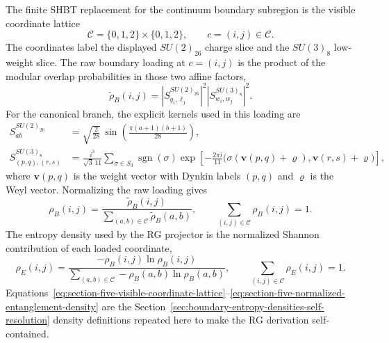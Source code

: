 \documentclass[11pt,letterpaper]{article}
\theoremstyle{plain}
\begin{document}
The finite SHBT replacement for the continuum boundary subregion is the visible
coordinate lattice
\begin{equation}
\label{eq:section-five-visible-coordinate-lattice}
 \mathcal C=\{0,1,2\}\times\{0,1,2\},
 \qquad
 c=(i,j)\in\mathcal C.
\end{equation}
The coordinates label the displayed $SU(2)_{26}$ charge slice and the
$SU(3)_8$ low-weight slice.  The raw boundary loading at $c=(i,j)$ is the
product of the modular overlap probabilities in those two affine factors,
\begin{equation}
\label{eq:section-five-raw-boundary-loading}
 \widetilde\rho_B(i,j)
 =
 \left|S^{SU(2)_{26}}_{q_i,\ell_j}\right|^2
 \left|S^{SU(3)_8}_{w_i,w_j}\right|^2.
\end{equation}
For the canonical branch, the explicit kernels used in this loading are
\begin{align}
\label{eq:section-five-explicit-visible-s-kernels}
 S_{ab}^{SU(2)_{26}}
 &=
 \sqrt{\frac{2}{28}}\,
 \sin\!\left(\frac{\pi(a+1)(b+1)}{28}\right),\nonumber\\
 S_{(p,q),(r,s)}^{SU(3)_8}
 &=
 \frac{i^3}{\sqrt{3}\,11}
 \sum_{\sigma\in S_3}
 \operatorname{sgn}(\sigma)
 \exp\!\left[
 -\frac{2\pi i}{11}
 \bigl(
 \sigma(\mathbf v(p,q)+\varrho),
 \mathbf v(r,s)+\varrho
 \bigr)
 \right],
\end{align}
where $\mathbf v(p,q)$ is the weight vector with Dynkin labels $(p,q)$ and
$\varrho$ is the Weyl vector.  Normalizing the raw loading gives
\begin{equation}
\label{eq:section-five-normalized-loading-density}
 \rho_B(i,j)
 =
 \frac{\widetilde\rho_B(i,j)}
 {\sum_{(a,b)\in\mathcal C}\widetilde\rho_B(a,b)},
 \qquad
 \sum_{(i,j)\in\mathcal C}\rho_B(i,j)=1.
\end{equation}
The entropy density used by the RG projector is the normalized Shannon
contribution of each loaded coordinate,
\begin{equation}
\label{eq:section-five-normalized-entanglement-density}
 \rho_E(i,j)
 =
 \frac{-\rho_B(i,j)\ln\rho_B(i,j)}
 {\sum_{(a,b)\in\mathcal C}-\rho_B(a,b)\ln\rho_B(a,b)},
 \qquad
 \sum_{(i,j)\in\mathcal C}\rho_E(i,j)=1.
\end{equation}
Equations~\eqref{eq:section-five-visible-coordinate-lattice}--\eqref{eq:section-five-normalized-entanglement-density}
are the Section~\ref{sec:boundary-entropy-densities-self-resolution} density
definitions repeated here to make the RG derivation self-contained.
\end{document}
